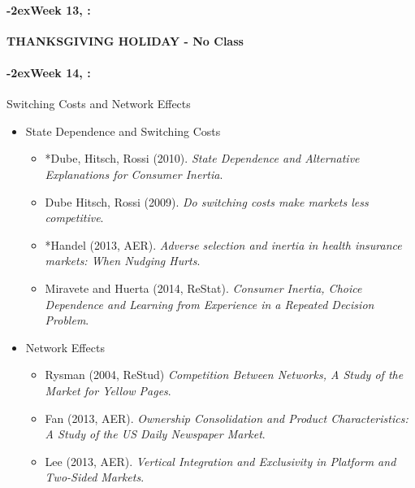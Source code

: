 \documentclass[11pt]{article}
\newcommand{\week}[1]{%
  \sbox{\weekdatebox}{\syldate{\today}}%
  \paragraph*{\kern-2ex\quad #1, \usebox{\weekdatebox}:}%
  \AdvanceDate[7]%
}
\begin{document}
\week{Week 13} \textbf{THANKSGIVING HOLIDAY - No Class}


\week{Week 14} Switching Costs and Network Effects
\begin{itemize}
\item State Dependence and Switching Costs
\begin{itemize}
\item *Dube, Hitsch, Rossi (2010). \textit{State Dependence and Alternative Explanations for Consumer Inertia}.
\item Dube Hitsch, Rossi (2009). \textit{Do switching costs make markets less competitive}.
\item *Handel (2013, AER). \textit{Adverse selection and inertia in health insurance markets: When Nudging Hurts}.
\item Miravete and Huerta (2014, ReStat). \textit{Consumer Inertia, Choice Dependence and Learning from Experience in a Repeated Decision Problem}.
\end{itemize}
\item Network Effects
\begin{itemize}
\item Rysman (2004, ReStud) \textit{Competition Between Networks, A Study of the Market for Yellow Pages}.
\item Fan (2013, AER). \textit{Ownership Consolidation and Product Characteristics: A Study of the US Daily Newspaper Market}.
\item Lee (2013, AER). \textit{Vertical Integration and Exclusivity in Platform and Two-Sided Markets}.
\end{itemize}
\end{itemize}
\end{document}
